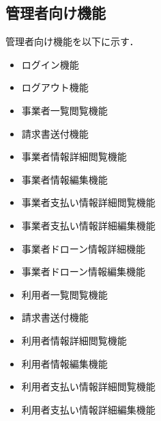 \documentclass[a4paper, titlepage]{jsarticle}
\begin{document}
\subsection{管理者向け機能}
管理者向け機能を以下に示す．
\begin{itemize}[labelwidth=\linewidth]
  \setlength{\leftskip}{1em}

  \item ログイン機能 %
  \item ログアウト機能 %

  \item 事業者一覧閲覧機能 %
  \item 請求書送付機能 %
  \item 事業者情報詳細閲覧機能 %
  \item 事業者情報編集機能 %
  \item 事業者支払い情報詳細閲覧機能 %
  \item 事業者支払い情報詳細編集機能 %
  \item 事業者ドローン情報詳細機能 %
  \item 事業者ドローン情報編集機能 %

  \item 利用者一覧閲覧機能 %
  \item 請求書送付機能 %
  \item 利用者情報詳細閲覧機能 %
  \item 利用者情報編集機能 %
  \item 利用者支払い情報詳細閲覧機能 %
  \item 利用者支払い情報詳細編集機能 %
  

\end{itemize}
\end{document}
